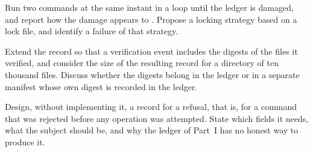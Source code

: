 \begin{exercise}
Run two  commands at the same instant in a loop until the ledger is damaged, and report how the damage appears to . Propose a locking strategy based on a lock file, and identify a failure of that strategy.
\end{exercise}

\begin{exercise}
Extend the record so that a verification event includes the digests of the files it verified, and consider the size of the resulting record for a directory of ten thousand files. Discuss whether the digests belong in the ledger or in a separate manifest whose own digest is recorded in the ledger.
\end{exercise}

\begin{exercise}
Design, without implementing it, a record for a refusal, that is, for a command that was rejected before any operation was attempted. State which fields it needs, what the subject should be, and why the ledger of Part~I has no honest way to produce it.
\end{exercise}
